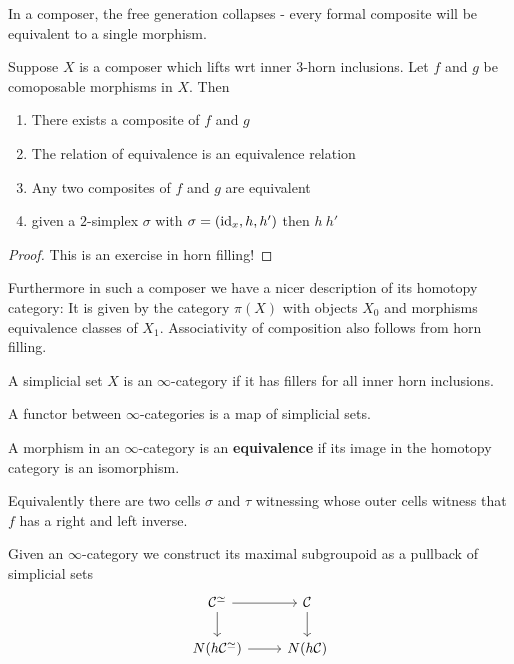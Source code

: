 In a composer, the free generation collapses - every formal composite will be equivalent to a single morphism.

\begin{lemma}
    Suppose $X$ is a composer which lifts wrt inner $3$-horn inclusions.
    Let $f$ and $g$ be comoposable morphisms in $X$.
    Then 
    \begin{enumerate}
        \item There exists a composite of $f$ and $g$
        \item The relation of equivalence is an equivalence relation
        \item Any two composites of $f$ and $g$ are equivalent
        \item given a $2$-simplex $\sigma$ with $\sigma = (\mathrm{id}_x, h, h')$ then $h ~ h'$
    \end{enumerate}
    \begin{proof}
        This is an exercise in horn filling!
    \end{proof}
\end{lemma}

Furthermore in such a composer we have a nicer description of its homotopy category:
It is given by the category $\pi(X)$  with objects $X_0$ and morphisms equivalence classes of $X_1$.
Associativity of composition also follows from horn filling.

\begin{definition}
    A simplicial set $X$ is an $\infty$-category if it has fillers for all inner horn inclusions.

    A functor between $\infty$-categories is a map of simplicial sets.
\end{definition}

\begin{definition}
    A morphism in an $\infty$-category is an \textbf{equivalence} if its image in the homotopy category is an isomorphism.

    Equivalently there are two cells $\sigma$ and $\tau$ witnessing whose outer cells witness that $f$ has a right and left inverse.
\end{definition}

\begin{definition}
    Given an $\infty$-category we construct its maximal subgroupoid as a pullback of simplicial sets
    \[\begin{tikzcd}
        \cat{C}^\simeq \ar[r] \ar[d] & \cat{C} \ar[d] \\
        N(h\cat{C}^\simeq) \ar[r] & N(h\cat{C})
    \end{tikzcd}\] 
\end{definition}

